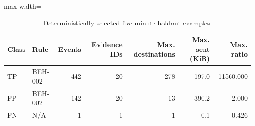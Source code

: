 \begin{table}[htbp]
\centering
\caption{Deterministically selected five-minute holdout examples.}
\label{tab:ctu13-error-examples}
\small
\begin{adjustbox}{max width=\linewidth}
\begin{tabular}{llrrrrr}
\toprule
Class & Rule & Events & Evidence IDs & Max. destinations & Max. sent (KiB) & Max. ratio \\
\midrule
TP & BEH-002 & 442 & 20 & 278 & 197.0 & 11560.000 \\
FP & BEH-002 & 142 & 20 & 13 & 390.2 & 2.000 \\
FN & N/A & 1 & 1 & 1 & 0.1 & 0.426 \\
\bottomrule
\end{tabular}
\end{adjustbox}
\par{}
\par{}
\end{table}
